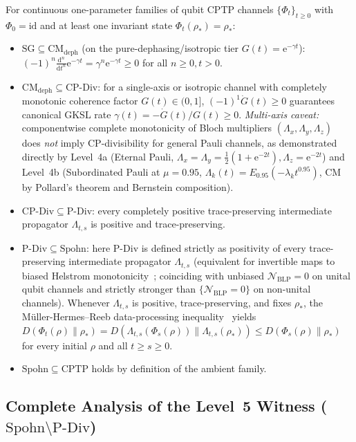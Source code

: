 \documentclass[onecolumn,10pt,notitlepage,amsmath,amssymb,floatfix]{revtex4-2}
\theoremstyle{plain}
\theoremstyle{definition}
\newcommand{\dd}{\mathrm{d}}
\newcommand{\ee}{\mathrm{e}}
\newcommand{\NBLP}{\mathcal{N}_{\mathrm{BLP}}}
\begin{document}
For continuous one-parameter families of qubit CPTP channels $\{\Phi_t\}_{t\ge 0}$ with $\Phi_0 = \mathrm{id}$ and at least one invariant state $\Phi_t(\rho_*) = \rho_*$:
\begin{itemize}[leftmargin=1.6em,itemsep=2pt]
\item $\mathrm{SG} \subseteq \mathrm{CM}_{\mathrm{deph}}$ (on the pure-dephasing/isotropic tier $G(t) = \ee^{-\gamma t}$): $(-1)^n \frac{\dd^n}{\dd t^n}\ee^{-\gamma t} = \gamma^n \ee^{-\gamma t} \ge 0$ for all $n \ge 0, t > 0$.
\item $\mathrm{CM}_{\mathrm{deph}} \subseteq \mathrm{CP\text{-}Div}$: for a single-axis or isotropic channel with completely monotonic coherence factor $G(t) \in (0,1]$, $(-1)^1\dot{G}(t) \ge 0$ guarantees canonical GKSL rate $\gamma(t) = -\dot{G}(t)/G(t) \ge 0$. \emph{Multi-axis caveat:} componentwise complete monotonicity of Bloch multipliers $(\Lambda_x, \Lambda_y, \Lambda_z)$ does \emph{not} imply CP-divisibility for general Pauli channels, as demonstrated directly by Level~4a (Eternal Pauli, $\Lambda_x=\Lambda_y=\frac{1}{2}(1+\ee^{-2t}), \Lambda_z=\ee^{-2t}$) and Level~4b (Subordinated Pauli at $\mu=0.95$, $\Lambda_k(t) = E_{0.95}(-\lambda_k t^{0.95})$, CM by Pollard's theorem and Bernstein composition).
\item $\mathrm{CP\text{-}Div} \subseteq \mathrm{P\text{-}Div}$: every completely positive trace-preserving intermediate propagator $\Lambda_{t,s}$ is positive and trace-preserving.
\item $\mathrm{P\text{-}Div} \subseteq \mathrm{Spohn}$: here $\mathrm{P\text{-}Div}$ is defined strictly as positivity of every trace-preserving intermediate propagator $\Lambda_{t,s}$ (equivalent for invertible maps to biased Helstrom monotonicity~\cite{Wissmann2015PRA,Bae2016PRL}; coinciding with unbiased $\NBLP = 0$ on unital qubit channels and strictly stronger than $\{\NBLP = 0\}$ on non-unital channels). Whenever $\Lambda_{t,s}$ is positive, trace-preserving, and fixes $\rho_*$, the M\"uller-Hermes--Reeb data-processing inequality~\cite{MullerHermes2017AHP} yields $D(\Phi_t(\rho)\parallel\rho_*) = D(\Lambda_{t,s}(\Phi_s(\rho))\parallel\Lambda_{t,s}(\rho_*)) \le D(\Phi_s(\rho)\parallel\rho_*)$ for every initial $\rho$ and all $t \ge s \ge 0$.
\item $\mathrm{Spohn} \subseteq \mathrm{CPTP}$ holds by definition of the ambient family.
\end{itemize}

\subsection{Complete Analysis of the Level~5 Witness (\texorpdfstring{$\mathrm{Spohn} \setminus \mathrm{P\text{-}Div}$}{Spohn minus P-Div})}
\end{document}

